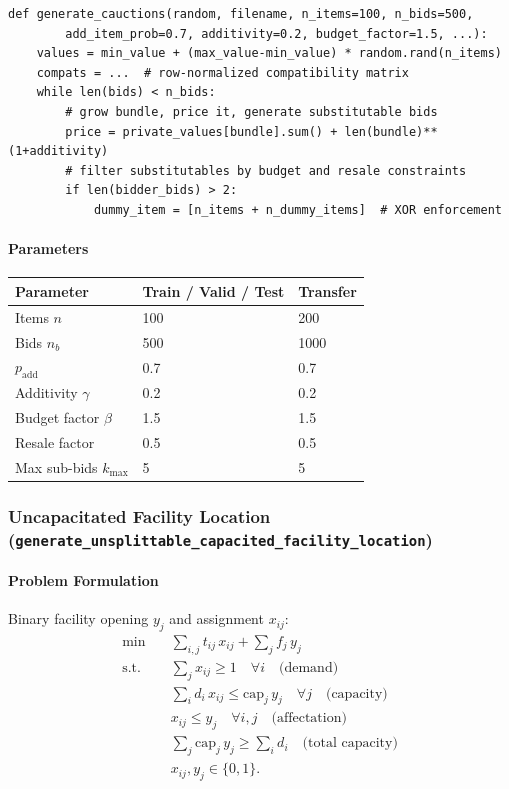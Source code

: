 \begin{lstlisting}
def generate_cauctions(random, filename, n_items=100, n_bids=500,
        add_item_prob=0.7, additivity=0.2, budget_factor=1.5, ...):
    values = min_value + (max_value-min_value) * random.rand(n_items)
    compats = ...  # row-normalized compatibility matrix
    while len(bids) < n_bids:
        # grow bundle, price it, generate substitutable bids
        price = private_values[bundle].sum() + len(bundle)**(1+additivity)
        # filter substitutables by budget and resale constraints
        if len(bidder_bids) > 2:
            dummy_item = [n_items + n_dummy_items]  # XOR enforcement
\end{lstlisting}

\paragraph{Parameters}

\begin{tabular}{lll}
\toprule
Parameter & Train / Valid / Test & Transfer \\
\midrule
Items $n$              & 100  & 200  \\
Bids $n_b$             & 500  & 1000 \\
$p_{\text{add}}$       & 0.7  & 0.7  \\
Additivity $\gamma$    & 0.2  & 0.2  \\
Budget factor $\beta$  & 1.5  & 1.5  \\
Resale factor          & 0.5  & 0.5  \\
Max sub-bids $k_{\max}$& 5    & 5    \\
\bottomrule
\end{tabular}

\subsubsection{Uncapacitated Facility Location (\texttt{generate\_unsplittable\_capacited\_facility\_location})}

\paragraph{Problem Formulation}

Binary facility opening $y_j$ and assignment $x_{ij}$:
\begin{align}
    \min\quad & \sum_{i,j} t_{ij}\,x_{ij} + \sum_j f_j\,y_j \\
    \text{s.t.}\quad
    & \sum_j x_{ij} \geq 1 \quad \forall i \quad\text{(demand)}\\
    & \sum_i d_i\,x_{ij} \leq \mathrm{cap}_j\,y_j \quad \forall j \quad\text{(capacity)}\\
    & x_{ij} \leq y_j \quad \forall i,j \quad\text{(affectation)}\\
    & \sum_j \mathrm{cap}_j\,y_j \geq \sum_i d_i \quad\text{(total capacity)}\\
    & x_{ij},y_j \in \{0,1\}.
\end{align}

